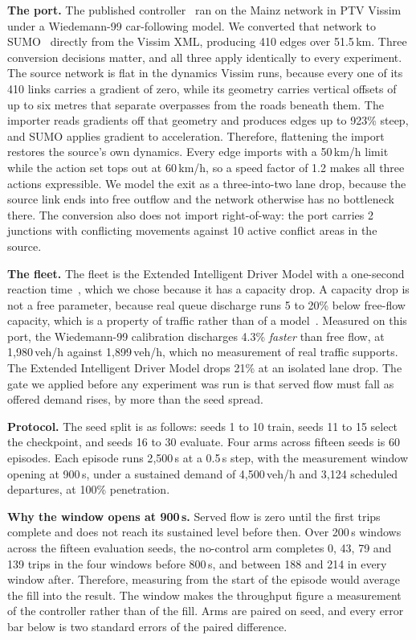 \noindent\textbf{The port.} The published controller~\cite{self_regulating_cars} ran on the Mainz network in PTV Vissim under a Wiedemann-99 car-following model. We converted that network to SUMO~\cite{lopez2018sumo} directly from the Vissim XML, producing 410 edges over 51.5\,km. Three conversion decisions matter, and all three apply identically to every experiment. The source network is flat in the dynamics Vissim runs, because every one of its 410 links carries a gradient of zero, while its geometry carries vertical offsets of up to six metres that separate overpasses from the roads beneath them. The importer reads gradients off that geometry and produces edges up to 923\% steep, and SUMO applies gradient to acceleration. Therefore, flattening the import restores the source's own dynamics. Every edge imports with a 50\,km/h limit while the action set tops out at 60\,km/h, so a speed factor of 1.2 makes all three actions expressible. We model the exit as a three-into-two lane drop, because the source link ends into free outflow and the network otherwise has no bottleneck there. The conversion also does not import right-of-way: the port carries 2 junctions with conflicting movements against 10 active conflict areas in the source.

\noindent\textbf{The fleet.} The fleet is the Extended Intelligent Driver Model with a one-second reaction time~\cite{salles2020eidm,treiber2000idm}, which we chose because it has a capacity drop. A capacity drop is not a free parameter, because real queue discharge runs 5 to 20\% below free-flow capacity, which is a property of traffic rather than of a model~\cite{hall1991capacity}. Measured on this port, the Wiedemann-99 calibration discharges 4.3\% \emph{faster} than free flow, at 1{,}980\,veh/h against 1{,}899\,veh/h, which no measurement of real traffic supports. The Extended Intelligent Driver Model drops 21\% at an isolated lane drop. The gate we applied before any experiment was run is that served flow must fall as offered demand rises, by more than the seed spread.


\noindent\textbf{Protocol.} The seed split is as follows: seeds 1 to 10 train, seeds 11 to 15 select the checkpoint, and seeds 16 to 30 evaluate. Four arms across fifteen seeds is 60 episodes. Each episode runs 2{,}500\,s at a 0.5\,s step, with the measurement window opening at 900\,s, under a sustained demand of 4{,}500\,veh/h and 3{,}124 scheduled departures, at 100\% penetration.

\noindent\textbf{Why the window opens at 900\,s.} Served flow is zero until the first trips complete and does not reach its sustained level before then. Over 200\,s windows across the fifteen evaluation seeds, the no-control arm completes 0, 43, 79 and 139 trips in the four windows before 800\,s, and between 188 and 214 in every window after. Therefore, measuring from the start of the episode would average the fill into the result. The window makes the throughput figure a measurement of the controller rather than of the fill. Arms are paired on seed, and every error bar below is two standard errors of the paired difference.

